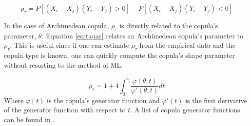 \begin{equation}
\rho_\tau = P[(X_i - X_j)(Y_i-Y_j)>0] - P[(X_i - X_j)(Y_i - Y_j)<0]
\label{eq:ktau}
\end{equation}

In the case of Archimedean copula, $\rho_\tau$ is directly related to the copula's parameter, $\theta$.
Equation \ref{eq:tauar} relates an Archimedean copula's parameter to $\rho_\tau$.  This is useful since if one can estimate $\rho_\tau$ from the empirical data and the copula type is known, one can quickly compute the copula's shape parameter without resorting to the method of ML.

\begin{equation}
\rho_\tau = 1 + 4 \int_0^1 \frac{\varphi(\theta,t)}{\varphi'(\theta, t)}dt
\label{eq:tauar}
\end{equation}
Where $\varphi(t)$ is the copula's generator function and $\varphi'(t)$ is the first derivative of the generator function with respect to $t$. A list of copula generator functions can be found in \cite{Nelsen2006}. 





